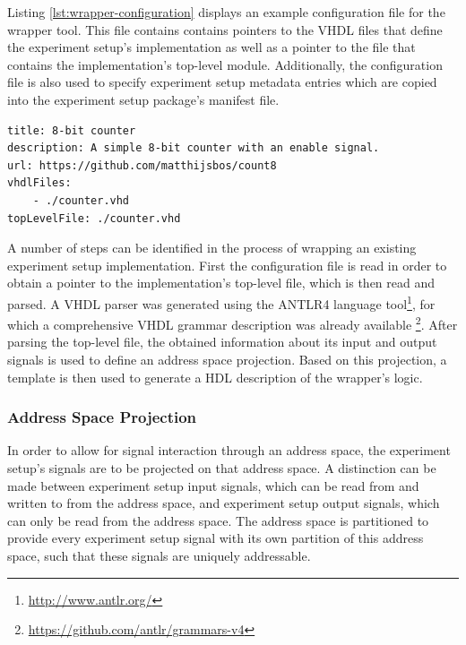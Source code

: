 \documentclass[main.tex]{subfiles}
\begin{document}

Listing \ref{lst:wrapper-configuration} displays an example configuration file for the wrapper tool. This file contains contains pointers to the VHDL files that define the experiment setup's implementation as well as a pointer to the file that contains the implementation's top-level module. Additionally, the configuration file is also used to specify experiment setup metadata entries which are copied into the experiment setup package's manifest file. 

\begin{lstlisting}[caption={Example \texttt{fpgaedu.yaml} wrapper configuration file for a simple 8-bit counter implementation.}, label={lst:wrapper-configuration}]
title: 8-bit counter
description: A simple 8-bit counter with an enable signal.
url: https://github.com/matthijsbos/count8
vhdlFiles: 
    - ./counter.vhd
topLevelFile: ./counter.vhd
\end{lstlisting}

A number of steps can be identified in the process of wrapping an existing experiment setup implementation. First the configuration file is read in order to obtain a pointer to the implementation's top-level file, which is then read and parsed. A VHDL parser was generated using the ANTLR4 language tool\footnote{\url{http://www.antlr.org/}}, for which a comprehensive VHDL grammar description was already available \footnote{\url{https://github.com/antlr/grammars-v4}}. After parsing the top-level file, the obtained information about its input and output signals is used to define an address space projection. Based on this projection, a template is then used to generate a HDL description of the wrapper's logic. 

\subsubsection{Address Space Projection}
In order to allow for signal interaction through an address space, the experiment setup's signals are to be projected on that address space. A distinction can be made between experiment setup input signals, which can be read from and written to from the address space, and experiment setup output signals, which can only be read from the address space. The address space is partitioned to provide every experiment setup signal with its own partition of this address space, such that these signals are uniquely addressable. 
\end{document}
